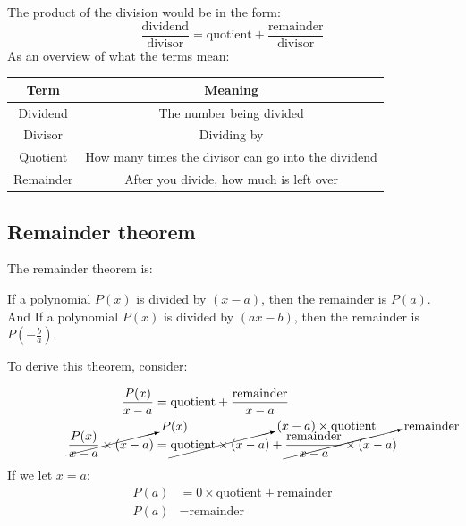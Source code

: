 \documentclass[a4paper,10pt]{report}
\begin{document}
The product of the division would be in the form:
$$
	\frac{\text{dividend}}{\text{divisor}} = \text{quotient} + \frac{\text{remainder}}{\text{divisor}}
$$
As an overview of what the terms mean:
\begin{center}
	\begin{tabular}{c|c}
		Term      & Meaning                                             \\ \hline
		Dividend  & The number being divided                            \\
		Divisor   & Dividing by                                         \\
		Quotient  & How many times the divisor can go into the dividend \\
		Remainder & After you divide, how much is left over
	\end{tabular}
\end{center}

\subsection{Remainder theorem}
The remainder theorem is:
\begin{center}
	If a polynomial $P(x)$ is divided by $(x - a)$, then the remainder is $P(a)$.\\
	And If a polynomial $P(x)$ is divided by $(ax - b)$, then the remainder is $P(-\frac{b}{a})$.
\end{center}

To derive this theorem, consider:
\begin{center}
	\begin{align*}
		\frac{P(x)}{x - a}                                 & = \text{quotient} + \frac{\text{remainder}}{x - a}                                                                                                       \\
		\cancelto{P(x)}{\frac{P(x)}{x - a} \times (x - a)} & = \cancelto{(x - a) \times \text{quotient}}{\text{quotient} \times (x - a)} + \cancelto{\text{remainder}}{\frac{\text{remainder}}{x - a} \times (x - a)}
	\end{align*}
	If we let $x = a$:
	\begin{align*}
		P(a) & = 0 \times \text{quotient} + \text{remainder} \\
		P(a) & = \text{remainder}
	\end{align*}
\end{center}
\end{document}
